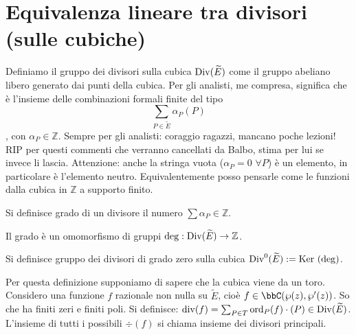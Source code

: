 \section{Equivalenza lineare tra divisori (sulle cubiche)}

\begin{definizione}
Definiamo il gruppo dei divisori sulla cubica $\mbox{Div}(\widetilde{E})$ come il gruppo abeliano libero generato dai punti della cubica. Per gli analisti, me compresa, significa che è l'insieme delle combinazioni formali finite del tipo $$\sum_{P \in \widetilde{E}} \alpha_P(P)$$,
con $\alpha_P \in \mathbb{Z}$.
Sempre per gli analisti: coraggio ragazzi, mancano poche lezioni!
RIP per questi commenti che verranno cancellati da Balbo, stima per lui se invece li lascia.
Attenzione: anche la stringa vuota ($\alpha_P=0$ $\forall P$) è un elemento, in particolare è l'elemento neutro.
Equivalentemente posso pensarle come le funzioni dalla cubica in $\mathbb{Z}$ a supporto finito.
\end{definizione}

\begin{definizione}
Si definisce grado di un divisore il numero $\sum \alpha_P \in \mathbb{Z}$.
\end{definizione} 

\begin{osservazione}Il grado è un omomorfismo di gruppi $\deg: \mbox{Div}(\widetilde{E}) \rightarrow \mathbb{Z}$.
\end{osservazione}

\begin{definizione}
Si definisce gruppo dei divisori di grado zero sulla cubica $\mbox{Div}^0(\widetilde{E}) := \mbox{Ker }(\deg)$.
\end{definizione}

\begin{definizione}
Per questa definizione supponiamo di sapere che la cubica viene da un toro.
Considero una funzione $f$ razionale non nulla su $\widetilde{E}$, cioè $f \in \bbC(\wp(z),\wp'(z))$. So che ha finiti zeri e finiti poli.
Si definisce: $\mbox{div}(f) = \sum_{P\in T} \text{ord}_P(f) \cdot (P) \in \mbox{Div}(\widetilde E)$.
L'insieme di tutti i possibili $\div(f)$ si chiama insieme dei divisori principali.
\end{definizione}

